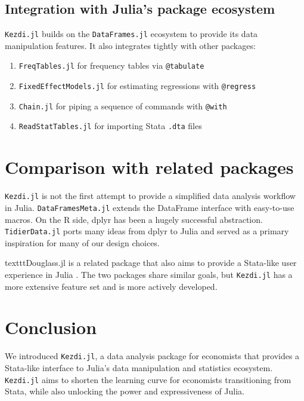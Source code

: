 \documentclass{juliacon}
\begin{document}
\subsection{Integration with Julia's package ecosystem}

\texttt{Kezdi.jl} builds on the \texttt{DataFrames.jl} ecosystem \cite{DataFrame.jl2023} to provide its data manipulation features. It also integrates tightly with other packages:

\begin{enumerate}
	\item \texttt{FreqTables.jl} \cite{FreqTables.jl2023} for frequency tables via \texttt{@tabulate}
	\item \texttt{FixedEffectModels.jl} \cite{FixedEffectModels.jl2023} for estimating regressions with \texttt{@regress}
	\item \texttt{Chain.jl} \cite{Chain} for piping a sequence of commands with \texttt{@with}
	\item \texttt{ReadStatTables.jl} \cite{ReadStatTables} for importing Stata \texttt{.dta} files
\end{enumerate}

\section{Comparison with related packages}
\texttt{Kezdi.jl} is not the first attempt to provide a simplified data analysis workflow in Julia. \texttt{DataFramesMeta.jl} \cite{DataFramesMeta} extends the DataFrame interface with easy-to-use macros. On the R side, dplyr \cite{dplyr2023} has been a hugely successful abstraction. \texttt{TidierData.jl} \cite{tidier2022} ports many ideas from dplyr to Julia and served as a primary inspiration for many of our design choices. 

texttt{Douglass.jl} is a related package that also aims to provide a Stata-like user experience in Julia \cite{Douglass.jl2023}. The two packages share similar goals, but \texttt{Kezdi.jl} has a more extensive feature set and is more actively developed.

\section{Conclusion}

We introduced \texttt{Kezdi.jl}, a data analysis package for economists that provides a Stata-like interface to Julia's data manipulation and statistics ecosystem. \texttt{Kezdi.jl} aims to shorten the learning curve for economists transitioning from Stata, while also unlocking the power and expressiveness of Julia.
\end{document}
